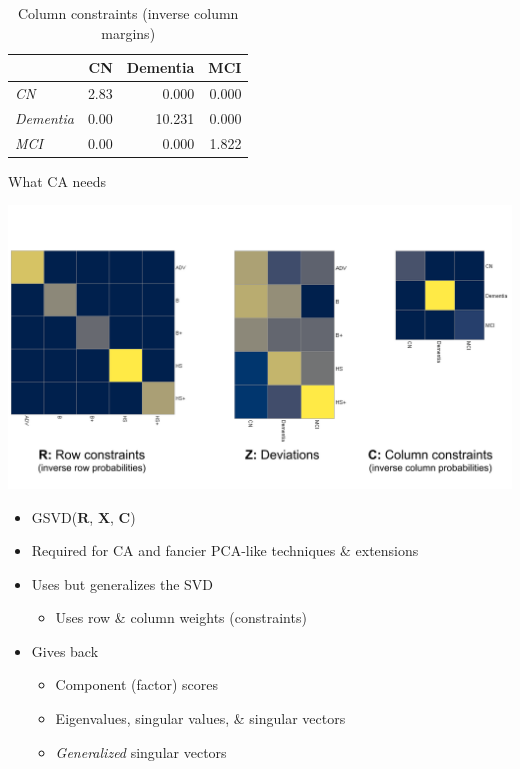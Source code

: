 \documentclass[
  ignorenonframetext,
]{beamer}
\providecommand{\tightlist}{%
  \setlength{\itemsep}{0pt}\setlength{\parskip}{0pt}}
\begin{document}
\begin{frame}

\begin{table}[t]

\caption{\label{tab:edu_dx_chi2_colconstraints}Column constraints (inverse column margins)}
\centering
\begin{tabular}{>{\em}lrrr}
\toprule
  & CN & Dementia & MCI\\
\midrule
CN & 2.83 & 0.000 & 0.000\\
Dementia & 0.00 & 10.231 & 0.000\\
MCI & 0.00 & 0.000 & 1.822\\
\bottomrule
\end{tabular}
\end{table}

\end{frame}

\begin{frame}{What CA needs}
\protect\hypertarget{what-ca-needs}{}

\includegraphics{../images/CA_matrices.png}

\end{frame}

\begin{frame}

\begin{itemize}[<+->]
\tightlist
\item
  GSVD(\(\mathbf{R}\), \(\mathbf{X}\), \(\mathbf{C}\))
\item
  Required for CA and fancier PCA-like techniques \& extensions
\item
  Uses but generalizes the SVD

  \begin{itemize}[<+->]
  \tightlist
  \item
    Uses row \& column weights (constraints)
  \end{itemize}
\item
  Gives back

  \begin{itemize}[<+->]
  \tightlist
  \item
    Component (factor) scores
  \item
    Eigenvalues, singular values, \& singular vectors
  \item
    \emph{Generalized} singular vectors
  \end{itemize}
\end{itemize}

\end{frame}
\end{document}
